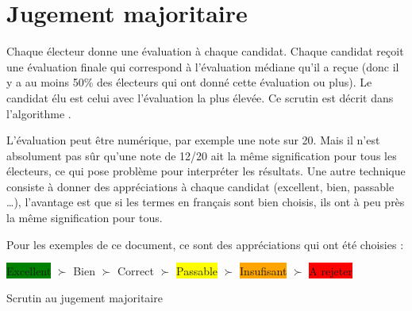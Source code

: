 \documentclass[../report]{subfiles}
\begin{document}
  \section{Jugement majoritaire}

  Chaque électeur donne une évaluation à chaque candidat.
  Chaque candidat reçoit une évaluation finale qui correspond à l'évaluation médiane qu'il a reçue (donc il y a au moins 
  50\% des électeurs qui ont donné cette évaluation ou plus).
  Le candidat élu est celui avec l'évaluation la plus élevée.
  Ce scrutin est décrit dans l'algorithme .

  L'évaluation peut être numérique, par exemple une note sur 20. Mais il n'est absolument pas sûr qu'une note de 12/20 ait
  la même signification pour tous les électeurs, ce qui pose problème pour interpréter les résultats. 
  Une autre technique consiste à donner des appréciations à chaque candidat (excellent, bien, passable …), l'avantage
  est que si les termes en français sont bien choisis, ils ont à peu près la même signification pour tous.

  Pour les exemples de ce document, ce sont des appréciations qui ont été choisies : 

  \begin{center}
  \colorbox{green}{Excellent} $\succ$
  \colorbox{green!50!yellow}{Bien} $\succ$
  \colorbox{green!25!yellow}{Correct} $\succ$
  \colorbox{yellow}{Passable} $\succ$
  \colorbox{orange}{Insufisant} $\succ$
  \colorbox{red}{A rejeter}
  \end{center}
  
  \begin{algorithm}[H]
  \caption{Scrutin au jugement majoritaire}%
  \label{scrutin:jugement-maj}
  \begin{algorithmic}[1]
    \ENDFOR{}
    \ENDFOR{}
  \end{algorithmic}
  \end{algorithm}
\end{document}
